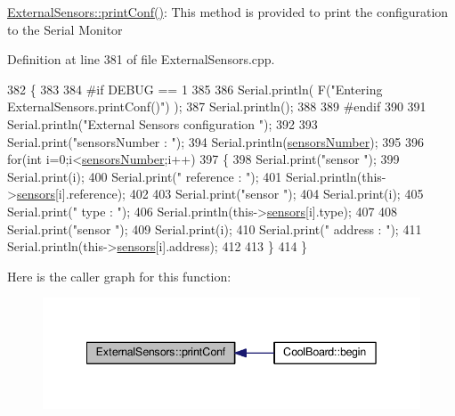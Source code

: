 \hyperlink{class_external_sensors_a78c2bf55084435dd51d3c559b2d3c6f3}{External\+Sensors\+::print\+Conf()}\+: This method is provided to print the configuration to the Serial Monitor 

Definition at line 381 of file External\+Sensors.\+cpp.


\begin{DoxyCode}
382 \{
383 
384 \textcolor{preprocessor}{#if DEBUG == 1}
385 
386     Serial.println( F(\textcolor{stringliteral}{"Entering ExternalSensors.printConf()"}) );
387     Serial.println();
388 
389 \textcolor{preprocessor}{#endif }
390 
391     Serial.println(\textcolor{stringliteral}{"External Sensors configuration "});
392 
393     Serial.print(\textcolor{stringliteral}{"sensorsNumber : "});
394     Serial.println(\hyperlink{class_external_sensors_a58e4fbf9adeae787d92be5fa33043b5d}{sensorsNumber});
395 
396     \textcolor{keywordflow}{for}(\textcolor{keywordtype}{int} i=0;i<\hyperlink{class_external_sensors_a58e4fbf9adeae787d92be5fa33043b5d}{sensorsNumber};i++)
397     \{
398         Serial.print(\textcolor{stringliteral}{"sensor "});
399         Serial.print(i);
400         Serial.print(\textcolor{stringliteral}{" reference : "});
401         Serial.println(this->\hyperlink{class_external_sensors_a284233f884fcf00154a44740cf1d9e1e}{sensors}[i].reference);
402 
403         Serial.print(\textcolor{stringliteral}{"sensor "});
404         Serial.print(i);
405         Serial.print(\textcolor{stringliteral}{" type : "});
406         Serial.println(this->\hyperlink{class_external_sensors_a284233f884fcf00154a44740cf1d9e1e}{sensors}[i].type);
407                 
408         Serial.print(\textcolor{stringliteral}{"sensor "});
409         Serial.print(i);
410         Serial.print(\textcolor{stringliteral}{" address : "});
411         Serial.println(this->\hyperlink{class_external_sensors_a284233f884fcf00154a44740cf1d9e1e}{sensors}[i].address);
412     
413     \}
414 \}
\end{DoxyCode}
Here is the caller graph for this function\+:\nopagebreak
\begin{figure}[H]
\begin{center}
\leavevmode
\includegraphics[width=342pt]{d1/d2f/class_external_sensors_a78c2bf55084435dd51d3c559b2d3c6f3_icgraph}
\end{center}
\end{figure}
\mbox{\label{class_external_sensors_a53177b81eca3be89508b5511ddcd00fc}} 
